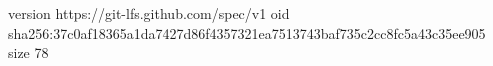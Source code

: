 version https://git-lfs.github.com/spec/v1
oid sha256:37c0af18365a1da7427d86f4357321ea7513743baf735c2cc8fc5a43c35ee905
size 78
